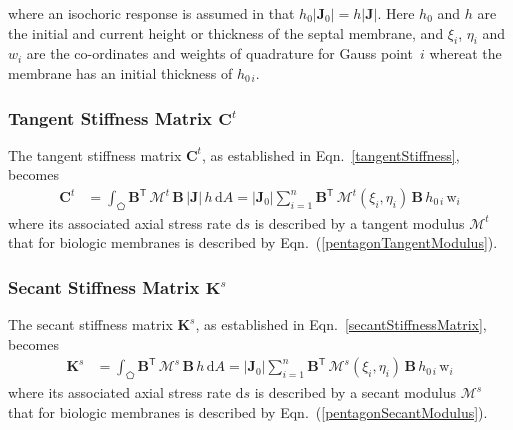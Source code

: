 where an isochoric response is assumed in that $h_0 | \mathbf{J}_0 | = h | \mathbf{J} |$. Here $h_0$ and $h$ are the initial and current height or thickness of the septal membrane, and $\xi_i$, $\eta_i$ and $w_i$ are the co-ordinates and weights of quadrature for Gauss point~$i$ whereat the membrane has an initial thickness of $h_{0\,i}$. 

\subsubsection{Tangent Stiffness Matrix $\mathbf{C}^t$}

The tangent stiffness matrix $\mathbf{C}^t$, as established in Eqn.~\eqref{tangentStiffness}, becomes 
\begin{equation}
	\begin{aligned}
		\mathbf{C}^t & =\int_{\pentagon} \mathbf{B}^{\mathsf{T}} \,  \boldsymbol{\mathcal{M}}^t \, \mathbf{B} \, |\mathbf{J}|  \, h \,  \mathrm{d} A
		= |\mathbf{J}_0| \sum_{i=1}^{n}   \mathbf{B}^{\mathsf{T}} \, \boldsymbol{\mathcal{M}}^t (\xi_i, \eta_i) \, \mathbf{B} \, h_{0\,i} \, \mathrm{w}_i 
	\end{aligned}
\end{equation} 
where its associated axial stress rate $\mathrm{d} s$ is described by a tangent modulus $\boldsymbol{\mathcal{M}}^{t}$ that for biologic membranes is described by Eqn.~(\ref{pentagonTangentModulus}).

\subsubsection{Secant Stiffness Matrix $\mathbf{K}^s$}

The secant stiffness matrix $\mathbf{K}^s$, as established in Eqn.~\eqref{secantStiffnessMatrix}, becomes
\begin{equation}
	\begin{aligned}
		\mathbf{K}^s & =\int_{\pentagon} \mathbf{B}^{\mathsf{T}} \,  \boldsymbol{\mathcal{M}}^s \, \mathbf{B}  \, h \,  \mathrm{d} A
		= |\mathbf{J}_0| \sum_{i=1}^{n}  \mathbf{B}^{\mathsf{T}} \, \boldsymbol{\mathcal{M}}^s (\xi_i, \eta_i) \, \mathbf{B} \, h_{0\,i} \, \mathrm{w}_i 
	\end{aligned}
\end{equation} 
where its associated axial stress rate $\mathrm{d} s$ is described by a secant modulus $\boldsymbol{\mathcal{M}}^{s}$ that for biologic membranes is described by Eqn.~(\ref{pentagonSecantModulus}).


